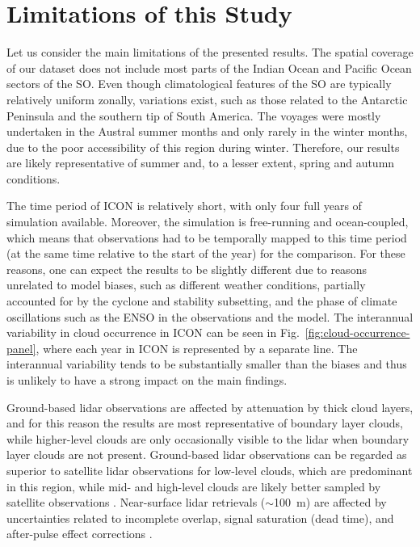 \documentclass[draft]{agujournal2019}
\begin{document}
\section{Limitations of this Study}
\label{sec:limitations}

Let us consider the main limitations of the presented results. The spatial coverage of our dataset does not include most parts of the Indian Ocean and Pacific Ocean sectors of the SO. Even though climatological features of the SO are typically relatively uniform zonally, variations exist, such as those related to the Antarctic Peninsula and the southern tip of South America. The voyages were mostly undertaken in the Austral summer months and only rarely in the winter months, due to the poor accessibility of this region during winter. Therefore, our results are likely representative of summer and, to a lesser extent, spring and autumn conditions.

The time period of ICON is relatively short, with only four full years of simulation available. Moreover, the simulation is free-running and ocean-coupled, which means that observations had to be temporally mapped to this time period (at the same time relative to the start of the year) for the comparison. For these reasons, one can expect the results to be slightly different due to reasons unrelated to model biases, such as different weather conditions, partially accounted for by the cyclone and stability subsetting, and the phase of climate oscillations such as the ENSO in the observations and the model. The interannual variability in cloud occurrence in ICON can be seen in Fig.~\ref{fig:cloud-occurrence-panel}, where each year in ICON is represented by a separate line. The interannual variability tends to be substantially smaller than the biases and thus is unlikely to have a strong impact on the main findings.

Ground-based lidar observations are affected by attenuation by thick cloud layers, and for this reason the results are most representative of boundary layer clouds, while higher-level clouds are only occasionally visible to the lidar when boundary layer clouds are not present. Ground-based lidar observations can be regarded as superior to satellite lidar observations for low-level clouds, which are predominant in this region, while mid- and high-level clouds are likely better sampled by satellite observations \cite{mcerlich2021}. Near-surface lidar retrievals ($\sim$100~m) are affected by uncertainties related to incomplete overlap, signal saturation (dead time), and after-pulse effect corrections \cite{kuma2021}.
\end{document}
